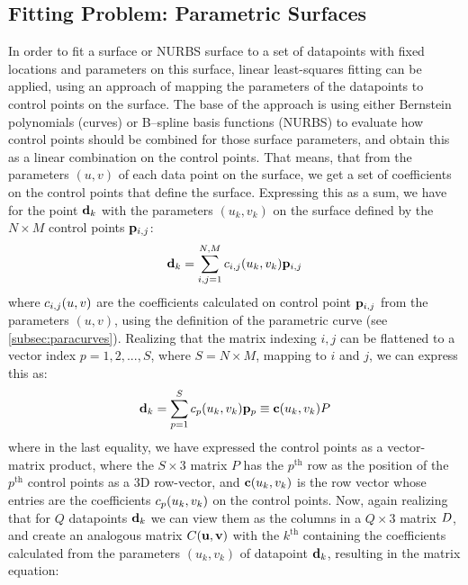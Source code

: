 \subsection{Fitting Problem: Parametric Surfaces}
In order to fit a \Bez surface or NURBS surface to a set of datapoints with fixed locations and parameters on this surface, linear least-squares fitting can be applied, using an approach of mapping the parameters of the datapoints to control points on the surface. The base of the approach is using either Bernstein polynomials (\Bez curves) or B--spline basis functions (NURBS) to evaluate how control points should be combined for those surface parameters, and obtain this as a linear combination on the control points. That means, that from the parameters $(u,v)$ of each data point on the surface, we get a set of coefficients on the control points that define the surface. Expressing this as a sum, we have for the point $\lsDataPointi{k}$ with the parameters $(u_k,v_k)$ on the surface defined by the $N \times M$ control points $\lsControlPointi{i,j}$:
\begin{equation}
\lsDataPointi{k} = \sum\limits_{i,j=1}^{N,M} \lsControlPointCoefi{i,j}(u_k,v_k) \lsControlPointi{i,j}
\end{equation} 
where $\lsControlPointCoefi{i,j}(u,v)$ are the coefficients calculated on control point $\lsControlPointi{i,j}$ from the parameters $(u,v)$, using the definition of the parametric curve (see \autoref{subsec:paracurves}). Realizing that the matrix indexing $i,j$ can be flattened to a vector index $p = 1,2,...,S$, where $S=N\times M$, mapping to $i$ and $j$, we can express this as:
\begin{equation}
\lsDataPointi{k} = \sum\limits_{p=1}^{S} \lsControlPointCoefi{p}(u_k,v_k) \lsControlPointi{p} \equiv \vec{\lsControlPointCoef}(u_k,v_k)\lsControlPointMatrix
\label{eqn:lsmatrix1}
\end{equation} 
where in the last equality, we have expressed the control points as a vector-matrix product, where the $S\times 3$ matrix $P$ has the $p^\text{th}$ row as the position of the $p^\text{th}$ control points as a 3D row-vector, and $\vec{\lsControlPointCoef}(u_k,v_k)$ is the row vector whose entries are the coefficients $\lsControlPointCoefi{p}(u_k,v_k)$ on the control points. Now, again realizing that for $Q$ datapoints $\lsDataPointi{k}$ we can view them as the columns in a $Q\times 3$ matrix $\lsDataPointMatrix$, and create an analogous matrix $\lsControlPointCoefMatrix(\vec{u},\vec{v})$ with the $k^\text{th}$ containing the coefficients calculated from the parameters $(u_k,v_k)$ of datapoint $\lsDataPointi{k}$, resulting in the matrix equation:

